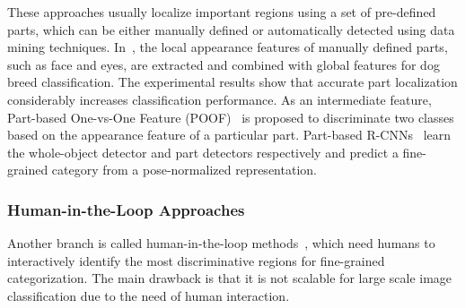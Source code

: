 \documentclass[journal]{IEEEtran}
\begin{document}
These approaches usually localize important regions using a set of pre-defined parts, which can be either manually defined or automatically detected using data mining techniques. In~\cite{Liu2012}, the local appearance features of manually defined parts, such as face and eyes, are extracted and combined with global features for dog breed classification. The experimental results show that accurate part localization considerably increases classification performance. As an intermediate feature, Part-based One-vs-One Feature (POOF)~\cite{poof} is proposed to discriminate two classes based on the appearance feature of a particular part. Part-based R-CNNs~\cite{part-based-rcnn} learn the whole-object detector and part detectors respectively and predict a fine-grained category from a pose-normalized representation.

\subsubsection{Human-in-the-Loop Approaches}

Another branch is called human-in-the-loop methods~\cite{Branson2010, crowdsourcing_fine_grained, wah:similarity}, which need humans to interactively identify the most discriminative regions for fine-grained categorization. The main drawback is that it is not scalable for large scale image classification due to the need of human interaction.

\end{document}

